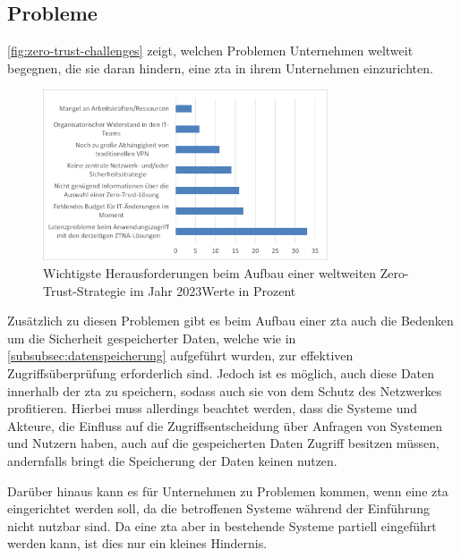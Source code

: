 \subsection{Probleme}\label{subsec:probleme}
\autoref{fig:zero-trust-challenges} zeigt, welchen Problemen Unternehmen weltweit begegnen, die sie daran hindern, eine \ac{zta} in ihrem Unternehmen einzurichten.\autocite[\vglf][]{fortinet-2023}
\begin{figure}[htbp]
    \centering
    \includegraphics[width=0.75\textwidth, trim = {0.2cm 0.3cm 0.4cm 0.25cm}, clip]{src/abbildungen/Herausforderungen_ZeroTrust}
    \captionsetup{width=\linewidth, format=hang}
    \caption[Wichtigste Herausforderungen beim Aufbau einer weltweiten Zero-Trust-Strategie im Jahr 2023]{Wichtigste Herausforderungen beim Aufbau einer weltweiten Zero-Trust-Strategie im Jahr 2023\newline Werte in Prozent}
    \label{fig:zero-trust-challenges}
\end{figure}

Zusätzlich zu diesen Problemen gibt es beim Aufbau einer \ac{zta} auch die Bedenken um die Sicherheit gespeicherter Daten, welche wie in \autoref{subsubsec:datenspeicherung} aufgeführt wurden, zur effektiven Zugriffsüberprüfung erforderlich sind.
Jedoch ist es möglich, auch diese Daten innerhalb der \ac{zta} zu speichern, sodass auch sie von dem Schutz des Netzwerkes profitieren.
Hierbei muss allerdings beachtet werden, dass die Systeme und Akteure, die Einfluss auf die Zugriffsentscheidung über Anfragen von Systemen und Nutzern haben, auch auf die gespeicherten Daten Zugriff besitzen müssen, andernfalls bringt die Speicherung der Daten keinen nutzen.

Darüber hinaus kann es für Unternehmen zu Problemen kommen, wenn eine \ac{zta} eingerichtet werden soll, da die betroffenen Systeme während der Einführung nicht nutzbar sind.
Da eine \ac{zta} aber in bestehende Systeme partiell eingeführt werden kann, ist dies nur ein kleines Hindernis.


